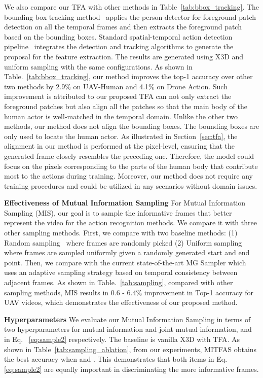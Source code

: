 \documentclass[10pt,twocolumn,letterpaper]{article}
\begin{document}
{We also compare our TFA with other methods in Table~\ref{tab:bbox_tracking}. The bounding box tracking method~\cite{demir2021tinyvirat} applies the person detector for foreground patch detection on all the temporal frames and then extracts the foreground patch based on the bounding boxes. Standard spatial-temporal action detection pipeline~\cite{liu2020argus} integrates the detection and tracking algorithms to generate the proposal for the feature extraction. The results are generated using X3D and uniform sampling with the same configurations. As shown in Table.~\ref{tab:bbox_tracking}, our method improves the top-1 accuracy over other two methods by 2.9\% on UAV-Human and 4.1\% on Drone Action. Such improvement is attributed to our proposed TFA can not only extract the foreground patches but also align all the patches so that the main body of the human actor is well-matched in the temporal domain. Unlike the other two methods, our method does not align the bounding boxes. The bounding boxes are only used to locate the human actor. As illustrated in Section~\ref{sec:tfa}, the alignment in our method is performed at the pixel-level, ensuring that the generated frame closely resembles the preceding one. Therefore, the model could focus on the pixels corresponding to the parts of the human body that contribute most to the actions during training. Moreover, our method does not require any training procedures and could be utilized in any scenarios without domain issues.


\textbf{Effectiveness of Mutual Information Sampling} For Mutual Information Sampling (MIS), our goal is to sample the informative frames that better represent the video for the action recognition methods. We compare it with three other sampling methods. First, we compare with two baseline methods:  (1) Random sampling~\cite{fischler1981random} where frames are randomly picked (2) Uniform sampling~\cite{krizhevsky2017imagenet} where frames are sampled uniformly given a randomly generated start and end point. Then, we compare with the current state-of-the-art MG Sampler \cite{zhi2021mgsampler} which uses an adaptive sampling strategy based on temporal consistency between adjacent frames. As shown in Table.~\ref{tab:sampling}, compared with other sampling methods, MIS results in 0.6 - 6.4\% improvement in Top-1 accuracy for UAV videos, which demonstrates the effectiveness of our proposed method.


\textbf{Hyperparameters}
\label{app: mi_sampling}
We evaluate our Mutual Information Sampling in terms of two hyperparameters for mutual information and joint mutual information,  and  in Eq.~ \ref{eq:sample2} respectively. The baseline is vanilla X3D with TFA. As shown in Table~\ref{tab:sampling_ablation}, from our experiments, MITFAS obtains the best accuracy when  and . This demonstrates that both items in Eq.\ref{eq:sample2} are equally important in discriminating the more informative frames.


}
\end{document}
